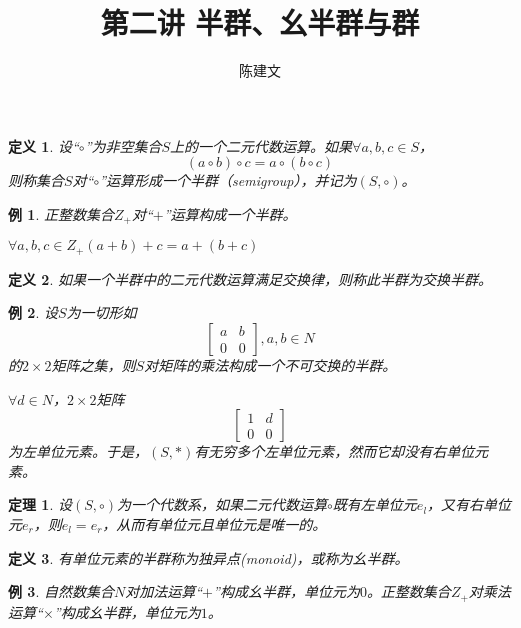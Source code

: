 \documentclass{article}
\newtheorem{Def}{定义}
\newtheorem{Thm}{定理}
\newtheorem*{Example}{例}
\begin{document}
\begin{CJK*}{UTF8}{gbsn}
  \title{第二讲 半群、幺半群与群}
  \author{陈建文}
  \maketitle
  


\begin{Def}
设“$\circ$”为非空集合$S$上的一个二元代数运算。如果$\forall a,b,c \in S$，
\[(a\circ b) \circ c = a \circ (b\circ c)\]
则称集合$S$对“$\circ$”运算形成一个半群（semigroup），并记为$(S,\circ)$。  
\end{Def}

\begin{Example}
  正整数集合$Z_+$对“$+$”运算构成一个半群。
\end{Example}

$\forall a,b,c \in Z_+ (a+b)+c = a + (b + c)$

\begin{Def}
  如果一个半群中的二元代数运算满足交换律，则称此半群为交换半群。
\end{Def}

\begin{Example}
  设$S$为一切形如
  \[\begin{bmatrix}
    a&b\\
    0&0
  \end{bmatrix},a,b\in N\]
的$2\times 2$矩阵之集，则$S$对矩阵的乘法构成一个不可交换的半群。

$\forall d\in N$，$2\times 2$矩阵
\[\begin{bmatrix}1&d\\0&0\end{bmatrix}\]
为左单位元素。于是，$(S,*)$有无穷多个左单位元素，然而它却没有右单位元素。
\end{Example}

\begin{Thm}
  设$(S,\circ)$为一个代数系，如果二元代数运算$\circ$既有左单位元$e_l$，又有右单位元$e_r$，则$e_l=e_r$，从而有单位元且单位元是唯一的。
\end{Thm}

\begin{Def}
  有单位元素的半群称为独异点(monoid)，或称为幺半群。
\end{Def}

\begin{Example}
  自然数集合$N$对加法运算“$+$”构成幺半群，单位元为$0$。正整数集合$Z_+$对乘法运算“$\times$”构成幺半群，单位元为$1$。
\end{Example}


\end{CJK*}
\end{document}
